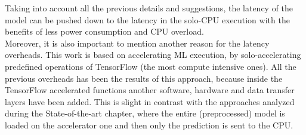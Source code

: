 Taking into account all the previous details and suggestions, the latency of the model can be pushed down to the latency in the solo-CPU execution with the benefits of less power consumption and CPU overload.\\

Moreover, it is also important to mention another reason for the latency overheads. This work is based on accelerating ML execution, by solo-accelerating predefined operations of TensorFlow (the most compute intensive ones). All the previous overheads has been the results of this approach, because inside the TensorFlow accelerated functions another software, hardware and data transfer layers have been added. This is slight in contrast with the approaches analyzed during the State-of-the-art chapter, where the entire (preprocessed) model is loaded on the accelerator one and then only the prediction is sent to the CPU.

\newpage


